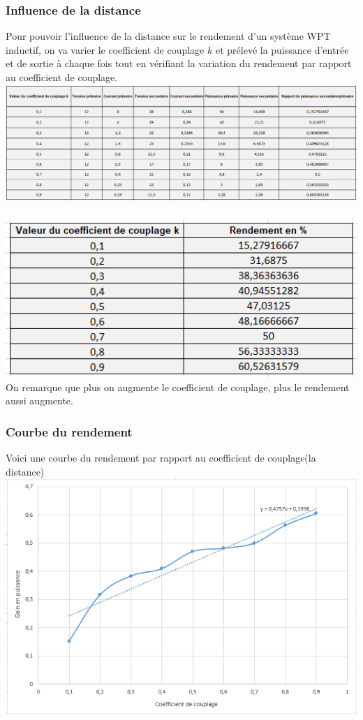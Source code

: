\documentclass[12pt,a4paper,titlepage,notitlepage]{article}
\begin{document}
	\subsubsection*{Influence de la distance}
	Pour pouvoir l'influence de la distance sur le rendement d'un système WPT inductif, on va varier le coefficient de couplage $k$ et prélevé la puissance d'entrée et de sortie à chaque fois tout en vérifiant la variation du rendement par rapport au coefficient de couplage.\\
	\includegraphics[width=1\textwidth]{WPT_simul_gain}\\
	
	\
	\\
	\includegraphics[width=1\textwidth]{WPT_simul_gain1}\\
	On remarque que plus on augmente le coefficient de couplage, plus le rendement aussi augmente.
	
	\subsubsection*{Courbe du rendement}
	Voici une courbe du rendement par rapport au coefficient de couplage(la distance)\\
	\includegraphics[width=1\textwidth]{WPT_simul_gain_graph}\\
	
\end{document}
